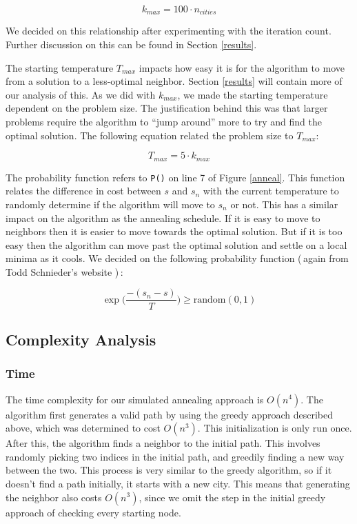 \documentclass{article}
\def\code#1{\texttt{#1}}
\def\bigO#1{$O(#1)$}
\begin{document}
\begin{multicols}{2}
        \begin{equation}
            k_{max} = 100\cdot n_{cities}
        \end{equation}

        We decided on this relationship after experimenting with the iteration count. Further discussion on this can be found in Section \ref{results}.

        The starting temperature $T_{max}$ impacts how easy it is for the algorithm to move from a solution to a less-optimal neighbor. Section \ref{results} will contain more of our analysis of this. As we did with $k_{max}$, we made the starting temperature dependent on the problem size. The justification behind this was that larger problems require the algorithm to ``jump around'' more to try and find the optimal solution. The following equation related the problem size to $T_{max}$:

        \begin{equation}
            T_{max} = 5\cdot k_{max}
        \end{equation}

        The probability function refers to \code{P()} on line 7 of Figure \ref{anneal}. This function relates the difference in cost between $s$ and $s_n$ with the current temperature to randomly determine if the algorithm will move to $s_n$ or not. This has a similar impact on the algorithm as the annealing schedule. If it is easy to move to neighbors then it is easier to move towards the optimal solution. But if it is too easy then the algorithm can move past the optimal solution and settle on a local minima as it cools. We decided on the following probability function (\,again from Todd Schnieder's website \cite{tspWeb})\,:

        \begin{equation}
            \exp{\Big(\frac{-(s_n - s)}{T}\Big)} \ge \text{random}(0,1)
        \end{equation}

        \subsection{Complexity Analysis}
        \subsubsection{Time}

        The time complexity for our simulated annealing approach is \bigO{n^4}. The algorithm first generates a valid path by using the greedy approach described above, which was determined to cost \bigO{n^3}. This initialization is only run once. After this, the algorithm finds a neighbor to the initial path. This involves randomly picking two indices in the initial path, and greedily finding a new way between the two. This process is very similar to the greedy algorithm, so if it doesn’t find a path initially, it starts with a new city. This means that generating the neighbor also costs \bigO{n^3}, since we omit the step in the initial greedy approach of checking every starting node. 
        

\end{multicols}
\end{document}
